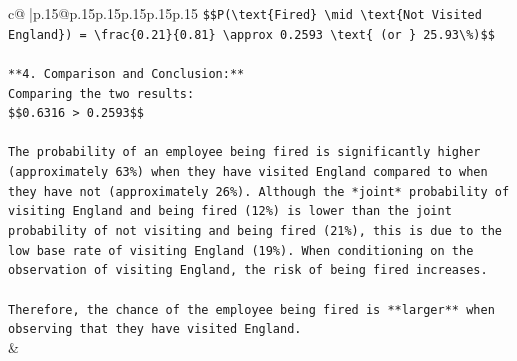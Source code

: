 \documentclass{article}
\begin{document}
{\begin{supertabular}{c@{$\;$}|p{.15\linewidth}@{}p{.15\linewidth}p{.15\linewidth}p{.15\linewidth}p{.15\linewidth}p{.15\linewidth}}
{{{\texttt{\$\$P(\textbackslash{}text\{Fired\} \textbackslash{}mid \textbackslash{}text\{Not Visited England\}) = \textbackslash{}frac\{0.21\}\{0.81\} \textbackslash{}approx 0.2593 \textbackslash{}text\{ (or \} 25.93\textbackslash{}\%)\$\$} \\
\\ 
\texttt{**4. Comparison and Conclusion:**} \\
\texttt{Comparing the two results:} \\
\texttt{\$\$0.6316 > 0.2593\$\$} \\
\\ 
\texttt{The probability of an employee being fired is significantly higher (approximately 63\%) when they have visited England compared to when they have not (approximately 26\%). Although the *joint* probability of visiting England and being fired (12\%) is lower than the joint probability of not visiting and being fired (21\%), this is due to the low base rate of visiting England (19\%). When conditioning on the observation of visiting England, the risk of being fired increases.} \\
\\ 
\texttt{Therefore, the chance of the employee being fired is **larger** when observing that they have visited England.} \\
            }
        }
    }
    & \\ \\


\end{supertabular}}
\end{document}
